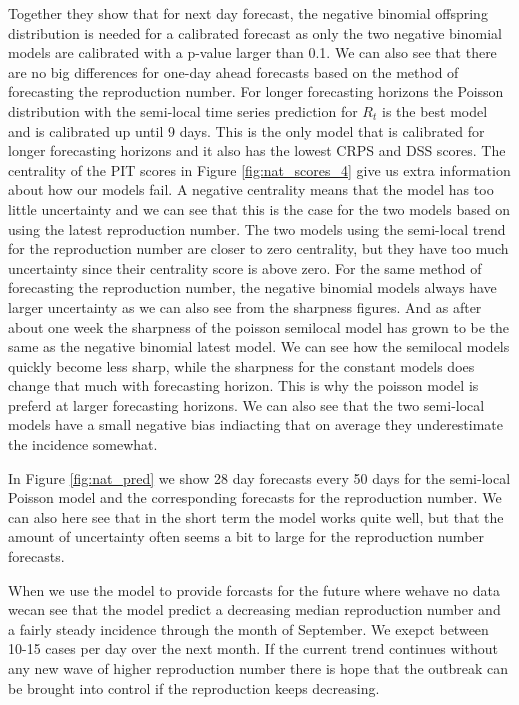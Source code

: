 \documentclass[12pt]{article}
\begin{document}
Together they show that for next day forecast, the negative binomial offspring distribution is needed for a calibrated forecast as only the two negative binomial models are calibrated with a p-value larger than 0.1. We can also see that there are no big differences for one-day ahead forecasts based on the method of forecasting the reproduction number. For longer forecasting horizons the Poisson distribution with the semi-local time series prediction for $R_t$ is the best model and is calibrated up until 9 days. This is the only model that is calibrated for longer forecasting horizons and it also has the lowest CRPS and DSS scores. The centrality of the PIT scores in Figure \ref{fig:nat_scores_4} give us extra information about how our models fail. A negative centrality means that the model has too little uncertainty and we can see that this is the case for the two models based on using the latest reproduction number. The two models using the semi-local trend for the reproduction number are closer to zero centrality, but they have too much uncertainty since their centrality score is above zero. For the same method of forecasting the reproduction number, the negative binomial models always have larger uncertainty as we can also see from the sharpness figures. And as after about one week the sharpness of the poisson semilocal model has grown to be the same as the negative binomial latest model. We can see how the semilocal models quickly become less sharp, while the sharpness for the constant models does change that much with forecasting horizon. This is why the poisson model is preferd at larger forecasting horizons. We can also see that the two semi-local models have a small negative bias indiacting that on average they underestimate the incidence somewhat.

In Figure \ref{fig:nat_pred} we show 28 day forecasts every 50 days for the semi-local Poisson model and the corresponding forecasts for the reproduction number. We can also here see that in the short term the model works quite well, but that the amount of uncertainty often seems a bit to large for the reproduction number forecasts. 

When we use the model to provide forcasts for the future where wehave no data wecan see that the model predict a decreasing median reproduction number and a fairly steady incidence through the month of September. We exepct between 10-15 cases per day over the next month. If the current trend continues without any new wave of higher reproduction number there is hope that the outbreak can be brought into control if the reproduction keeps decreasing. 
\end{document}

